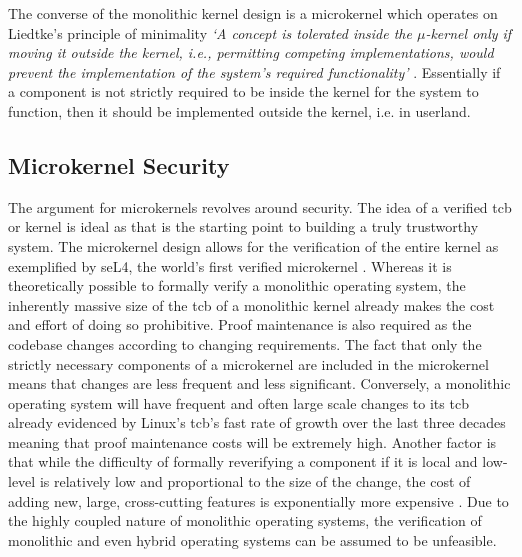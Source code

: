 \documentclass[literature_review.tex]{subfiles}
\begin{document}
The converse of the monolithic kernel design is a microkernel which operates on Liedtke's principle of minimality \textit{`A concept is tolerated inside the $\mu$-kernel only if moving it outside the kernel, i.e., permitting competing implementations, would prevent the implementation of the system's required functionality'} \citep{Liedtke_95}. Essentially if a component is not strictly required to be inside the kernel for the system to function, then it should be implemented outside the kernel, i.e. in userland. 

\subsection{Microkernel Security}
The argument for microkernels revolves around security. The idea of a verified \gls{tcb} or kernel is ideal as that is the starting point to building a truly trustworthy system. The microkernel design allows for the verification of the entire kernel as exemplified by seL4, the world's first verified microkernel \citep{Klein_AEHCDEEKNSTW_10}. Whereas it is theoretically possible to formally verify a monolithic operating system, the inherently massive size of the \gls{tcb} of a monolithic kernel already makes the cost and effort of doing so prohibitive. Proof maintenance is also required as the codebase changes according to changing requirements. The fact that only the strictly necessary components of a microkernel are included in the microkernel means that changes are less frequent and less significant. Conversely, a monolithic operating system will have frequent and often large scale changes to its \gls{tcb} already evidenced by Linux's \gls{tcb}'s fast rate of growth over the last three decades meaning that proof maintenance costs will be extremely high. Another factor is that while the difficulty of formally reverifying a component if it is local and low-level is relatively low and proportional to the size of the change, the cost of adding new, large, cross-cutting features is exponentially more expensive \citep{Klein_AEHCDEEKNSTW_10}. Due to the highly coupled nature of monolithic operating systems, the verification of monolithic and even hybrid operating systems can be assumed to be unfeasible. 
\end{document}
